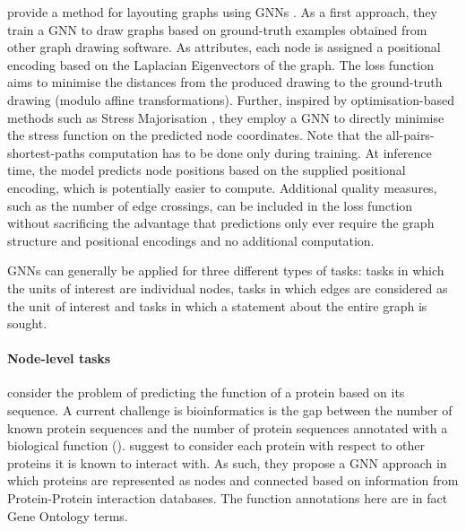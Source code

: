 \documentclass[
	fontsize=10pt, %
	twoside=false, %
	secnumdepth=1, %
  toc=indentunnumbered %
]{kaobook}
\begin{document}
\citeauthor{tiezzi_GraphNeuralNetworks_2021} provide a method for layouting
graphs using GNNs
\cite{tiezzi_GraphNeuralNetworks_2021}
. As a first approach, they train a GNN to draw graphs based on
ground-truth examples obtained from other graph drawing software. As attributes,
each node is assigned a positional encoding based on the Laplacian Eigenvectors
of the graph. The loss function aims to minimise the distances from the produced
drawing to the ground-truth drawing (modulo affine transformations).
Further, inspired by optimisation-based methods such as Stress Majorisation
\cite{gansner_GraphDrawingStress_2005}, they employ a GNN to directly minimise
the stress function on the predicted node coordinates. Note that the
all-pairs-shortest-paths computation has to be done only during training. At
inference time, the model predicts node positions based on the supplied
positional encoding, which is potentially easier to compute. Additional quality
measures, such as the number of edge crossings, can be included in the loss
function without sacrificing the advantage that predictions only ever require
the graph structure and positional encodings and no additional computation.





GNNs can generally be applied for three different types of tasks:
 tasks in which the units of interest are individual nodes,
 tasks in which edges are considered as the unit of interest and
 tasks in which a statement about the entire graph is sought.

\paragraph{Node-level tasks}
\citeauthor{you_DeepGraphGOGraphNeural_2021}
\cite{you_DeepGraphGOGraphNeural_2021} consider the problem of predicting the
function of a protein based on its sequence. A current challenge is
bioinformatics is the gap between the number of known protein sequences and the
number of protein sequences annotated with a biological function
(). \citeauthor{you_DeepGraphGOGraphNeural_2021}
suggest to consider each protein with respect to other proteins it is known to
interact with. As such, they propose a GNN approach in which proteins are
represented as nodes and connected based on information from Protein-Protein
interaction databases. The function annotations here are in fact Gene Ontology
terms.
\end{document}
